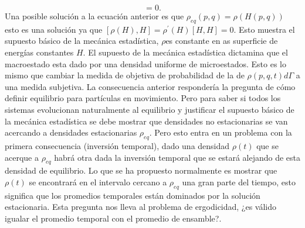 \begin{equation}
[\rho_{eq}, H]=0.
\end{equation}
Una posible solución a la ecuación anterior es que $\rho_{eq}(p,q)=\rho(H(p,q))$ esto es una solución ya que $[\rho(H),H]=\rho^{'}(H)[H,H]=0$. Esto muestra el supuesto básico de la mecánica estadística, $\rho$es constante en as superficie de energías constantes $H$. El supuesto de la mecánica estadística dictamina que el macroestado esta dado por una densidad uniforme de microestados. Esto es lo mismo que cambiar la medida de objetiva de probabilidad de la de $\rho(p,q,t) d\Gamma$ a una medida subjetiva.
La consecuencia anterior respondería la pregunta de cómo definir equilibrio para partículas en movimiento. Pero para saber si todos los sistemas evolucionan naturalmente al equilibrio  y justificar el supuesto básico de la mecánica estadística se debe mostrar que densidades no estacionarias se van acercando a densidades estacionarias $\rho_{eq}$. Pero esto entra en un problema con la primera consecuencia (inversión temporal), dado una densidad $\rho(t)$ que se acerque a $\rho_{eq}$ habrá otra dada la inversión temporal que se estará alejando de esta densidad de equilibrio. Lo que se ha propuesto normalmente es mostrar que $\rho(t)$ se encontrará en el intervalo cercano a $\rho_{eq}$ una gran parte del tiempo, esto significa que los promedios temporales están dominados por la solución estacionaria. Esta pregunta nos lleva al problema de ergodicidad, ¿es válido igualar el promedio temporal con el promedio de ensamble?.

